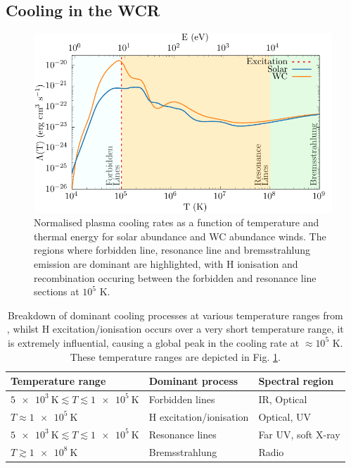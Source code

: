 \subsection{Cooling in the WCR}
\label{sec:wcrcooling}
\begin{figure}[h]
  \centering
  \includegraphics{assets/cooling-breakdown/cooling-curve-solar-withev.pdf}
  \caption[WC \& solar abundance plasma cooling curves]{Normalised plasma cooling rates as a function of temperature and thermal energy for solar abundance and WC abundance winds. The regions where forbidden line, resonance line and bremsstrahlung emission are dominant are highlighted, with H ionisation and recombination occuring between the forbidden and resonance line sections at $10^5$ \si{\kelvin}.}
  \label{fig:wcsolcooling}
\end{figure}

\begin{table}[h]
  \centering
  \begin{tabular}{lll}
  \\ \hline 
  \textbf{Temperature range} & \textbf{Dominant process} & \textbf{Spectral region} \\ \hline
  $\SI{5e3}{\kelvin} \lesssim T \lesssim \SI{1e5}{\kelvin} $ & Forbidden lines & IR, Optical \\
  $T \approx \SI{1e5}{\kelvin}$ & H excitation/ionisation & Optical, UV \\
  $\SI{5e3}{\kelvin} \lesssim T \lesssim \SI{1e5}{\kelvin} $ & Resonance lines & Far UV, soft X-ray \\
  $T \gtrsim \SI{1e8}{\kelvin} $ & Bremsstrahlung & Radio \\ \hline
  \end{tabular}
  \caption[Cooling processes at various temperature ranges]{Breakdown of dominant cooling processes at various temperature ranges from \cite{dysonPhysicsInterstellarMedium2021}, whilst H excitation/ionisation occurs over a very short temperature range, it is extremely influential, causing a global peak in the cooling rate at $\approx 10^5$ \si{\kelvin}. These temperature ranges are depicted in Fig. \ref{fig:wcsolcooling}.}
  \label{tab:coolprocess}
  \end{table}

